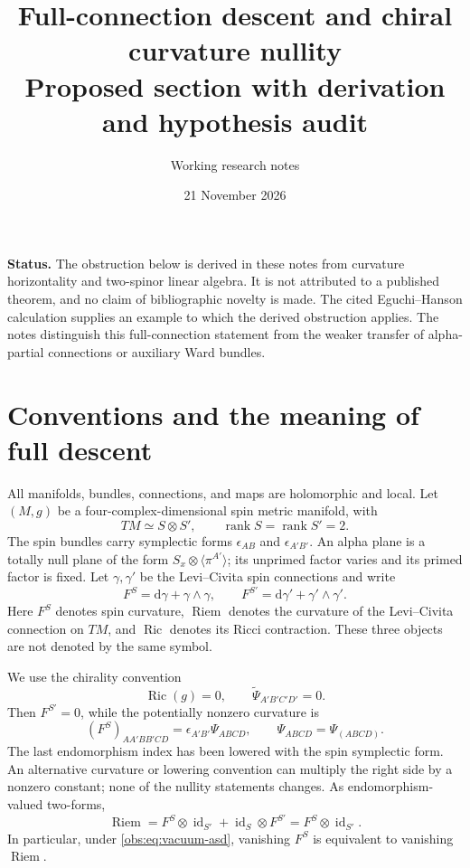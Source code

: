 \documentclass[11pt]{article}
\title{Full-connection descent and chiral curvature nullity\\
\large Proposed section with derivation and hypothesis audit}
\author{Working research notes}
\date{21 November 2026}
\theoremstyle{definition}
\theoremstyle{remark}
\newcommand{\Ric}{\operatorname{Ric}}
\newcommand{\Riem}{\operatorname{Riem}}
\newcommand{\id}{\operatorname{id}}
\newcommand{\dd}{\mathrm d}
\newcommand{\rank}{\operatorname{rank}}
\begin{document}
\maketitle

\noindent\textbf{Status.}
The obstruction below is derived in these notes from curvature horizontality
and two-spinor linear algebra. It is not attributed to a published theorem,
and no claim of bibliographic novelty is made. The cited Eguchi--Hanson
calculation supplies an example to which the derived obstruction applies.
The notes distinguish this full-connection statement from the weaker
transfer of alpha-partial connections or auxiliary Ward bundles.

\section{Conventions and the meaning of full descent}

All manifolds, bundles, connections, and maps are holomorphic and local.
Let $(M,g)$ be a four-complex-dimensional spin metric manifold, with
\[
 TM\simeq S\otimes S',\qquad \rank S=\rank S'=2.
\]
The spin bundles carry symplectic forms $\epsilon_{AB}$ and
$\epsilon_{A'B'}$. An alpha plane is a totally null plane of the form
$S_x\otimes\langle\pi^{A'}\rangle$; its unprimed factor varies and its
primed factor is fixed. Let $\gamma,\gamma'$ be the Levi--Civita spin
connections and write
\[
 F^S=\dd\gamma+\gamma\wedge\gamma,
 \qquad F^{S'}=\dd\gamma'+\gamma'\wedge\gamma'.
\]
Here $F^S$ denotes spin curvature, $\Riem$ denotes the curvature of the
Levi--Civita connection on $TM$, and $\Ric$ denotes its Ricci contraction.
These three objects are not denoted by the same symbol.

We use the chirality convention
\begin{equation}\label{obs:eq:vacuum-asd}
 \Ric(g)=0,\qquad \widetilde\Psi_{A'B'C'D'}=0.
\end{equation}
Then $F^{S'}=0$, while the potentially nonzero curvature is
\begin{equation}\label{obs:eq:spin-curvature}
 (F^S)_{AA'BB'CD}=\epsilon_{A'B'}\Psi_{ABCD},
 \qquad \Psi_{ABCD}=\Psi_{(ABCD)}.
\end{equation}
The last endomorphism index has been lowered with the spin symplectic form.
An alternative curvature or lowering convention can multiply the right
side by a nonzero constant; none of the nullity statements changes.
As endomorphism-valued two-forms,
\begin{equation}\label{obs:eq:riemann-spin}
 \Riem=F^S\otimes\id_{S'}+\id_S\otimes F^{S'}
       =F^S\otimes\id_{S'}.
\end{equation}
In particular, under \eqref{obs:eq:vacuum-asd}, vanishing $F^S$ is equivalent
to vanishing $\Riem$.
\end{document}
